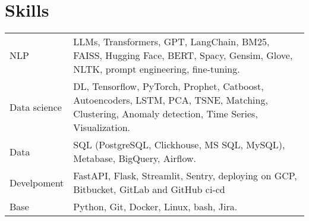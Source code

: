 \documentclass[a4paper,12pt]{article}
\begin{document}
\section{Skills}
\begin{tabularx}{\linewidth}{@{}l X@{}}
NLP &  \normalsize{LLMs, Transformers, GPT, LangChain, BM25, FAISS, Hugging Face, BERT, Spacy, Gensim, Glove, NLTK, prompt engineering, fine-tuning.}\\
Data science  &  \normalsize{DL, Tensorflow, PyTorch, Prophet, Catboost, Autoencoders, LSTM, PCA, TSNE, Matching, Clustering, Anomaly detection, Time Series, Visualization.}\\
Data &  \normalsize{SQL (PostgreSQL, Clickhouse, MS SQL, MySQL), Metabase, BigQuery, Airflow.}\\
Develpoment &  \normalsize{FastAPI, Flask, Streamlit, Sentry, deploying on GCP, Bitbucket, GitLab and GitHub ci-cd} \\
Base &  \normalsize{Python, Git, Docker, Linux, bash, Jira.}
\end{tabularx}

\vfill
{}
\end{document}
